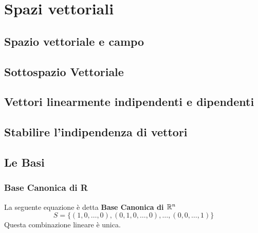 \chapter{Spazi vettoriali}
\section{Spazio vettoriale e campo}
\section{Sottospazio Vettoriale}
\section{Vettori linearmente indipendenti e dipendenti}
\section{Stabilire l'indipendenza di vettori}
\section{Le Basi}
\subsection{Base Canonica di R}
La seguente equazione è detta \textbf{Base Canonica di $\mathbb{R}^n$}
\[ S = \{(1,0,\dots,0),(0,1,0,\dots,0),\dots,(0,0,\dots,1)\} \]
Questa combinazione lineare è unica.
